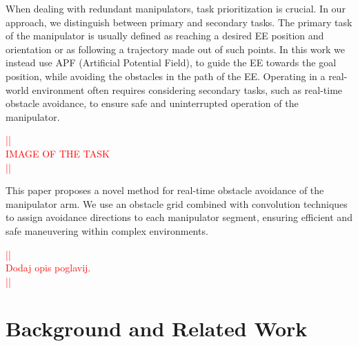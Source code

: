 \documentclass[a4paper]{article}
\newcommand\todocomment[1]{\textcolor{red}{||\\ #1\\||}}
\begin{document}
When dealing with redundant manipulators, task prioritization is crucial. In our approach, we distinguish between primary and secondary tasks. The primary task of the manipulator is usually defined as reaching a desired EE position and orientation or as following a trajectory made out of such points. In this work we instead use APF (Artificial Potential Field), to guide the EE towards the goal position, while avoiding the obstacles in the path of the EE. Operating in a real-world environment often requires considering secondary tasks, such as real-time obstacle avoidance, to ensure safe and uninterrupted operation of the manipulator.

\todocomment{IMAGE OF THE TASK}

This paper proposes a novel method for real-time obstacle avoidance of the manipulator arm. We use an obstacle grid combined with convolution techniques to assign avoidance directions to each manipulator segment, ensuring efficient and safe maneuvering within complex environments. 


\todocomment{Dodaj opis poglavij.}

\section{Background and Related Work}

%
%
%
\end{document}
